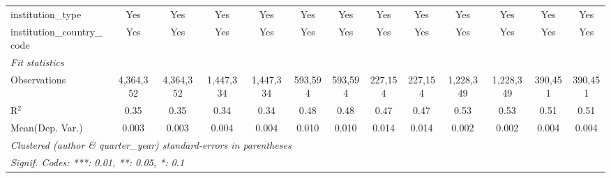 \begin{tabular}{lcccccccccccc}
   institution\_type                        & Yes            & Yes              & Yes             & Yes             & Yes            & Yes              & Yes           & Yes             & Yes           & Yes             & Yes           & Yes\\  
   institution\_country\_code               & Yes            & Yes              & Yes             & Yes             & Yes            & Yes              & Yes           & Yes             & Yes           & Yes             & Yes           & Yes\\  
   \midrule
   \emph{Fit statistics}\\
   Observations                             & 4,364,352      & 4,364,352        & 1,447,334       & 1,447,334       & 593,594        & 593,594          & 227,154       & 227,154         & 1,228,349     & 1,228,349       & 390,451       & 390,451\\  
   R$^2$                                    & 0.35           & 0.35             & 0.34            & 0.34            & 0.48           & 0.48             & 0.47          & 0.47            & 0.53          & 0.53            & 0.51          & 0.51\\  
Mean(Dep. Var.) & 0.003 & 0.003 & 0.004 & 0.004 & 0.010 & 0.010 & 0.014 & 0.014 & 0.002 & 0.002 & 0.004 & 0.004 \\
   \midrule \midrule
   \multicolumn{13}{l}{\emph{Clustered (author \& quarter\_year) standard-errors in parentheses}}\\
   \multicolumn{13}{l}{\emph{Signif. Codes: ***: 0.01, **: 0.05, *: 0.1}}\\
\end{tabular}
\par\endgroup
